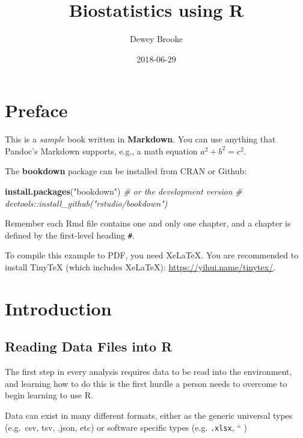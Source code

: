 \documentclass[12pt,]{article}
\title{Biostatistics using R}
\author{Dewey Brooke}
\date{2018-06-29}
\newenvironment{Shaded}{\begin{snugshade}}{\end{snugshade}}
\newcommand{\KeywordTok}[1]{\textcolor[rgb]{0.13,0.29,0.53}{\textbf{#1}}}
\newcommand{\StringTok}[1]{\textcolor[rgb]{0.31,0.60,0.02}{#1}}
\newcommand{\CommentTok}[1]{\textcolor[rgb]{0.56,0.35,0.01}{\textit{#1}}}
\newcommand{\NormalTok}[1]{#1}
\theoremstyle{definition}
\theoremstyle{definition}
\theoremstyle{definition}
\theoremstyle{remark}
\begin{document}
\maketitle

{
\hypersetup{linkcolor=black}
\setcounter{tocdepth}{2}
\tableofcontents
}
\listoftables
\listoffigures
\section*{Preface}\label{preface}

This is a \emph{sample} book written in \textbf{Markdown}. You can use
anything that Pandoc's Markdown supports, e.g., a math equation
\(a^2 + b^2 = c^2\).

The \textbf{bookdown} package can be installed from CRAN or Github:

\begin{Shaded}
\begin{Highlighting}[]
\KeywordTok{install.packages}\NormalTok{(}\StringTok{"bookdown"}\NormalTok{)}
\CommentTok{# or the development version}
\CommentTok{# devtools::install_github("rstudio/bookdown")}
\end{Highlighting}
\end{Shaded}

Remember each Rmd file contains one and only one chapter, and a chapter
is defined by the first-level heading \texttt{\#}.

To compile this example to PDF, you need XeLaTeX. You are recommended to
install TinyTeX (which includes XeLaTeX):
\url{https://yihui.name/tinytex/}.

\section{Introduction}\label{intro}

\subsection*{Reading Data Files into R}\label{reading-data-files-into-r}

The first step in every analysis requires data to be read into the
environment, and learning how to do this is the first hurdle a person
needs to overcome to begin learning to use R.

Data can exist in many different formats, either as the generic
universal types (e.g.~csv, tsv, .json, etc) or software specific types
(e.g. \texttt{.xlsx}, `` )
\end{document}
